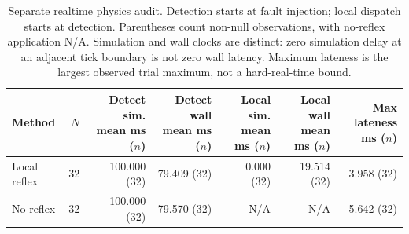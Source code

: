 \begin{table}[htbp]
\centering\small
\setlength{\tabcolsep}{3pt}
\caption{Separate realtime physics audit. Detection starts at fault injection; local dispatch starts at detection. Parentheses count non-null observations, with no-reflex application N/A. Simulation and wall clocks are distinct: zero simulation delay at an adjacent tick boundary is not zero wall latency. Maximum lateness is the largest observed trial maximum, not a hard-real-time bound.}
\label{tab:v3_realtime}
\begin{tabular}{lrrrrrr}
\toprule
Method & $N$ & \shortstack{Detect sim.\\mean ms ($n$)} & \shortstack{Detect wall\\mean ms ($n$)} & \shortstack{Local sim.\\mean ms ($n$)} & \shortstack{Local wall\\mean ms ($n$)} & \shortstack{Max lateness\\ms ($n$)} \\
\midrule
Local reflex & 32 & 100.000 (32) & 79.409 (32) & 0.000 (32) & 19.514 (32) & 3.958 (32) \\
No reflex & 32 & 100.000 (32) & 79.570 (32) & N/A & N/A & 5.642 (32) \\
\bottomrule
\end{tabular}
\end{table}
